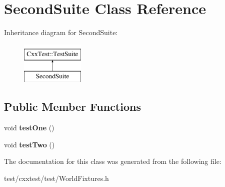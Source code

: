 \hypertarget{classSecondSuite}{\section{Second\-Suite Class Reference}
\label{classSecondSuite}
}
Inheritance diagram for Second\-Suite\-:\begin{figure}[H]
\begin{center}
\leavevmode
\includegraphics[height=2.000000cm]{classSecondSuite}
\end{center}
\end{figure}
\subsection*{Public Member Functions}
\begin{DoxyCompactItemize}
\item 
\hypertarget{classSecondSuite_ae549a35fee729fb18bc8d99ffa0f0cc3}{void {\bfseries test\-One} ()}\label{classSecondSuite_ae549a35fee729fb18bc8d99ffa0f0cc3}

\item 
\hypertarget{classSecondSuite_adb3f5675b0fe3f574625744b7e145129}{void {\bfseries test\-Two} ()}\label{classSecondSuite_adb3f5675b0fe3f574625744b7e145129}

\end{DoxyCompactItemize}


The documentation for this class was generated from the following file\-:\begin{DoxyCompactItemize}
\item 
test/cxxtest/test/World\-Fixtures.\-h\end{DoxyCompactItemize}

